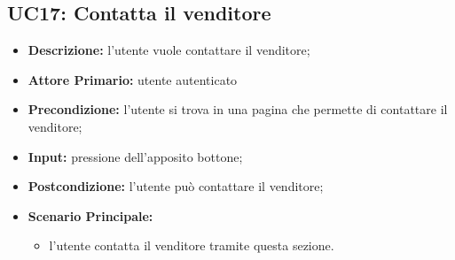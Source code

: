 \subsection{UC17: Contatta il venditore}
\label{sec:UC17}
\begin{itemize}
    \item \textbf{Descrizione:} l'utente vuole contattare il venditore;
    \item \textbf{Attore Primario:} utente autenticato
    \item \textbf{Precondizione:} l'utente si trova in una pagina che permette di contattare il venditore;
    \item \textbf{Input:} pressione dell'apposito bottone;
    \item \textbf{Postcondizione:} l'utente può contattare il venditore;
    \item \textbf{Scenario Principale:}
          \begin{itemize}
              \item l'utente contatta il venditore tramite questa sezione.
          \end{itemize}
\end{itemize}